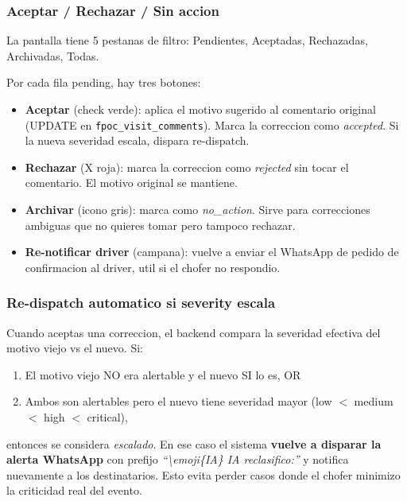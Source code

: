 \documentclass[11pt,a4paper]{article}
\begin{document}
\subsubsection{Aceptar / Rechazar / Sin accion}

La pantalla tiene 5 pestanas de filtro: Pendientes, Aceptadas,
Rechazadas, Archivadas, Todas.

Por cada fila pending, hay tres botones:

\begin{itemize}
  \item \textbf{Aceptar} (check verde): aplica el motivo sugerido al
        comentario original (UPDATE en
        \texttt{fpoc\_visit\_comments}). Marca la correccion como
        \emph{accepted}. Si la nueva severidad escala, dispara
        re-dispatch.
  \item \textbf{Rechazar} (X roja): marca la correccion como
        \emph{rejected} sin tocar el comentario. El motivo original se
        mantiene.
  \item \textbf{Archivar} (icono gris): marca como \emph{no\_action}.
        Sirve para correcciones ambiguas que no quieres tomar pero
        tampoco rechazar.
  \item \textbf{Re-notificar driver} (campana): vuelve a enviar el
        WhatsApp de pedido de confirmacion al driver, util si el
        chofer no respondio.
\end{itemize}

\subsubsection{Re-dispatch automatico si severity escala}

Cuando aceptas una correccion, el backend compara la severidad efectiva
del motivo viejo vs el nuevo. Si:

\begin{enumerate}
  \item El motivo viejo NO era alertable y el nuevo SI lo es, OR
  \item Ambos son alertables pero el nuevo tiene severidad mayor
        (low $<$ medium $<$ high $<$ critical),
\end{enumerate}

\noindent entonces se considera \emph{escalado}. En ese caso el sistema
\textbf{vuelve a disparar la alerta WhatsApp} con prefijo
\emph{``\textbackslash{}emoji\{IA\} IA reclasifico:''} y notifica
nuevamente a los destinatarios. Esto evita perder casos donde el
chofer minimizo la criticidad real del evento.
\end{document}
